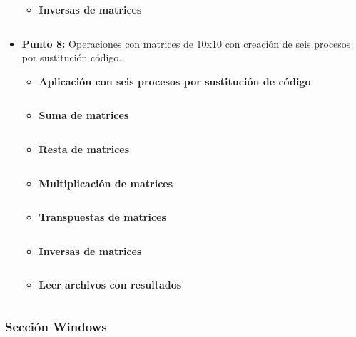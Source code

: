 \documentclass[12pt]{article}
\begin{document}
\begin{itemize}
\begin{itemize}
                        \item \textbf{Inversas de matrices}
                            \inputminted{c++}{Code/Linux/7_inversa.c} 
                            
                    \end{itemize}
                \newpage
                \item[\Checkmark] \textbf{Punto 8:} Operaciones con matrices de 10x10 con creación de seis procesos por sustitución código.
                    

                    \begin{itemize}
                        \item \textbf{Aplicación con seis procesos por sustitución de código}
                            \inputminted{c++}{Code/Linux/8.c}
                            
                        \item \textbf{Suma de matrices}
                            \inputminted{c++}{Code/Linux/suma.c}

                        \item \textbf{Resta de matrices}
                            \inputminted{c++}{Code/Linux/resta.c}

                        \item \textbf{Multiplicación de matrices}
                            \inputminted{c++}{Code/Linux/multiplicacion.c}  

                        \item \textbf{Transpuestas de matrices}
                            \inputminted{c++}{Code/Linux/transpuesta.c}

                        \item \textbf{Inversas de matrices}
                            \inputminted{c++}{Code/Linux/inversa.c}
                            
                        \item \textbf{Leer archivos con resultados}
                            \inputminted{c++}{Code/Linux/leerArchivos.c}

                    \end{itemize}
       \end{itemize}
\item 
        
        \subsubsection{Sección Windows}
        
\end{document}
